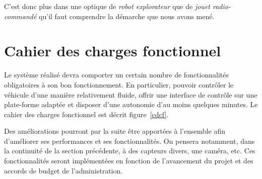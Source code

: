\documentclass[a4paper,12pt]{report}
\begin{document}
C’est donc plus dans une optique de \emph{robot explorateur} que de \emph{jouet radio-commandé} qu’il faut comprendre la démarche que nous avons mené.

	\section{Cahier des charges fonctionnel}
	Le système réalisé devra comporter un certain nombre de fonctionnalités obligatoires à son bon fonctionnement. En particulier, pouvoir contrôler le véhicule d’une manière relativement fluide, offrir une interface de contrôle sur une plate-forme adaptée et disposer d’une autonomie d’au moins quelques minutes. Le cahier des charges fonctionnel est décrit figure~\ref{cdcf}.

Des améliorations pourront par la suite être apportées à l’ensemble afin d’améliorer ses performances et ses fonctionnalités. On pensera notamment, dans la continuité de la section précédente, à des capteurs divers, une caméra, etc. Ces fonctionnalités seront implémentées en fonction de l’avancement du projet et des accords de budget de l’administration.
\end{document}
